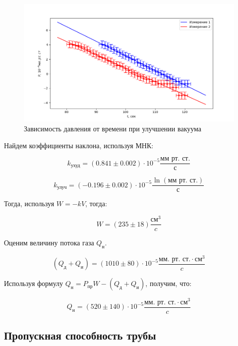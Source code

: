 \documentclass[a4paper]{article}
\begin{document}
\begin{figure}[h]
    \includegraphics[scale=0.7]{Измерения3.png}
    \caption{Зависимость давления от времени при улучшении вакуума}
\end{figure}

Найдем коэффициенты наклона, используя МНК:

\begin{equation}
    k_\text{ухуд} = (0.841 \pm 0.002) \cdot 10^{-5} \frac{\text{мм рт. ст.}}{\text{с}}
\end{equation}

\begin{equation}
    k_\text{улуч} = (-0.196 \pm 0.002) \cdot 10^{-5} \frac{\ln(\text{мм рт. ст.})}{\text{с}}
\end{equation}

Тогда, используя $W = -kV$, тогда:

\begin{equation}
    W = (235 \pm 18) \frac{\text{см}^3}{c}
\end{equation}

Оценим величину потока газа $Q_\text{н}$.

\begin{equation}
(Q_\text{д} + Q_\text{и}) = \left( 1010\pm 80\right) \cdot 10^{-5} \frac{\text{мм. рт. ст.} \cdot \text{см}^3}{c}
\end{equation}

 Используя формулу $Q_\text{н} = P_\text{пр}W - (Q_\text{д} + Q_\text{и})$, получим, что: 
 
\begin{equation}
     Q_\text{н} = \left( 520\pm 140 \right) \cdot 10^{-5} \frac{\text{мм. рт. ст.} \cdot \text{см}^3}{c}
\end{equation}

\subsection{Пропускная способность трубы}
\end{document}

